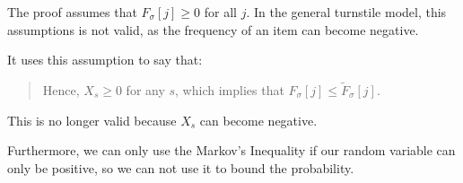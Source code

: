 The proof assumes that $F_\sigma[j] \geq 0$ for all $j$.
In the general turnstile model, this assumptions is not valid, as the frequency of an item can become negative.

It uses this assumption to say that:

\begin{quote}
	Hence, $X_s \geq 0$ for any $s$, which implies that  $F_\sigma[j] \leq \tilde{F}_\sigma[j]$.
\end{quote}

This is no longer valid because $X_s$ can become negative.

Furthermore, we can only use the Markov's Inequality if our random variable can only be positive, so we can not use it to bound the probability.
